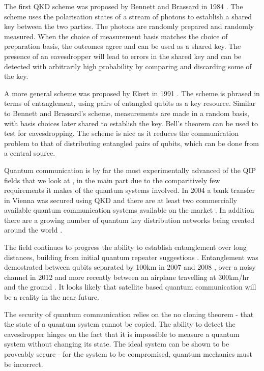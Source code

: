 The first QKD scheme was proposed by Bennett and Brassard in 1984 \cite{bennett_brassard_84}. The scheme uses the polarisation states of a stream of photons to establish a shared key between the two parties. The photons are randomly prepared and randomly measured. When the choice of measurement basis matches the choice of preparation basis, the outcomes agree and can be used as a shared key. The presence of an eavesdropper will lead to errors in the shared key and can be detected with arbitrarily high probability by comparing and discarding some of the key.

A more general scheme was proposed by Ekert in 1991 \cite{ekert_91}. The scheme is phrased in terms of entanglement, using pairs of entangled qubits as a key resource. Similar to Bennett and Brassard's scheme, measurements are made in a random basis, with basis choices later shared to establish the key. Bell's theorem \cite{bells_theorem} can be used to test for eavesdropping. The scheme is nice as it reduces the communication problem to that of distributing entangled pairs of qubits, which can be done from a central source.

Quantum communication is by far the most experimentally advanced of the QIP fields that we look at \cite{quantum_crypt_review}, in the main part due to the comparitively few requirements it makes of the quantum systems involved. In 2004 a bank transfer in Vienna was secured using QKD \cite{qkd_bank_transfer_04} and there are at least two commercially available quantum communication systems available on the market \cite{idquant_qkd_system, magiq_qkd_system}. In addition there are a growing number of quantum key distribution networks being created around the world \cite{secoqc_network, tokyo_qkd_network}.

The field continues to progress the ability to establish entanglement over long distances, building from initial quantum repeater suggestions \cite{quantum_repeaters}. Entanglement was demostrated between qubits separated by 100km in 2007 and 2008 \cite{entanglement_97km_08, entanglement_144km_07}, over a noisy channel in 2012 \cite{qkd_noisy_channel_12} and more recently between an airplane travelling at 300km/hr and the ground \cite{qkd_airbourne_13}. It looks likely that satellite based quantum communication will be a reality in the near future.


The security of quantum communication relies on the no cloning theorem \cite{no_cloning} - that the state of a quantum system cannot be copied. The ability to detect the eavesdropper hinges on the fact that it is impossible to measure a quantum system without changing its state. The ideal system can be shown to be proveably secure - for the system to be compromised, quantum mechanics must be incorrect.

